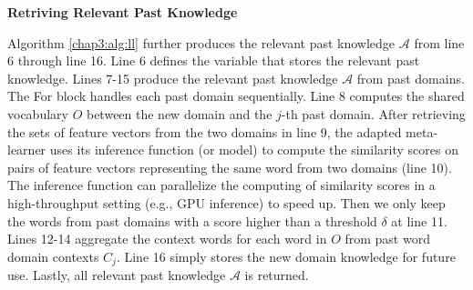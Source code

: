 
\textbf{Retriving Relevant Past Knowledge}

Algorithm \ref{chap3:alg:ll} further produces the relevant past knowledge $\mathcal{A}$ from line 6 through line 16.
Line 6 defines the variable that stores the relevant past knowledge.
Lines 7-15 produce the relevant past knowledge $\mathcal{A}$ from past domains.
The For block handles each past domain sequentially.
Line 8 computes the shared vocabulary $O$ between the new domain and the $j$-th past domain.
After retrieving the sets of feature vectors from the two domains in line 9, the adapted meta-learner uses its inference function (or model) to compute the similarity scores on pairs of feature vectors representing the same word from two domains (line 10).
The inference function can parallelize the computing of similarity scores in a high-throughput setting (e.g., GPU inference) to speed up.
Then we only keep the words from past domains with a score higher than a threshold $\delta$ at line 11.
Lines 12-14 aggregate the context words for each word in $O$ from past word domain contexts $C_j$.
Line 16 simply stores the new domain knowledge for future use.
Lastly, all relevant past knowledge $\mathcal{A}$ is returned.

